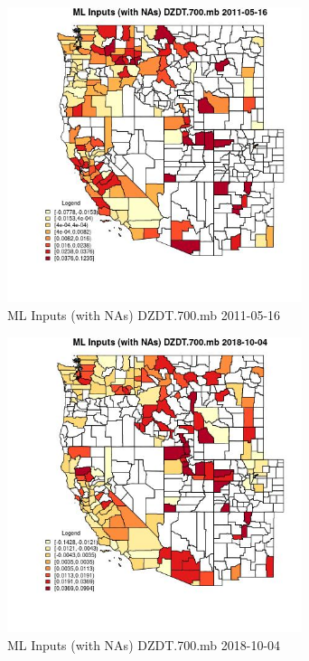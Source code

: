 \begin{figure} 
\centering  
\includegraphics[width=0.77\textwidth]{Code_Outputs/Report_ML_input_PM25_Step4_part_f_de_duplicated_aveswNAs_CountyDZDT700mbMean2011-05-16.jpg} 
\caption{\label{fig:Report_ML_input_PM25_Step4_part_f_de_duplicated_aveswNAsCountyDZDT700mbMean2011-05-16}ML Inputs (with NAs) DZDT.700.mb 2011-05-16} 
\end{figure} 
 

\begin{figure} 
\centering  
\includegraphics[width=0.77\textwidth]{Code_Outputs/Report_ML_input_PM25_Step4_part_f_de_duplicated_aveswNAs_CountyDZDT700mbMean2018-10-04.jpg} 
\caption{\label{fig:Report_ML_input_PM25_Step4_part_f_de_duplicated_aveswNAsCountyDZDT700mbMean2018-10-04}ML Inputs (with NAs) DZDT.700.mb 2018-10-04} 
\end{figure} 
 

